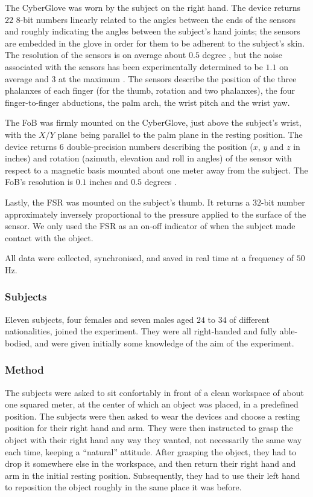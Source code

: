 The CyberGlove was worn by the subject on the right hand. The device
returns $22$ $8$-bit numbers linearly related to the angles between
the ends of the sensors and roughly indicating the angles between the
subject's hand joints; the sensors are embedded in the glove in order
for them to be adherent to the subject's skin. The resolution of the
sensors is on average about $0.5$ degree \cite{cyberglove}, but the
noise associated with the sensors has been experimentally determined
to be $1.1$ on average and $3$ at the maximum \cite{212431}. The
sensors describe the position of the three phalanxes of each finger
(for the thumb, rotation and two phalanxes), the four finger-to-finger
abductions, the palm arch, the wrist pitch and the wrist yaw.

The FoB was firmly mounted on the CyberGlove, just above the subject's
wrist, with the $X/Y$ plane being parallel to the palm plane in the
resting position. The device returns $6$ double-precision numbers
describing the position ($x$, $y$ and $z$ in inches) and rotation
(azimuth, elevation and roll in angles) of the sensor with respect to
a magnetic basis mounted about one meter away from the subject. The
FoB's resolution is $0.1$ inches and $0.5$ degrees \cite{fob}.

Lastly, the FSR was mounted on the subject's thumb. It returns a
$32$-bit number approximately inversely proportional to the pressure
applied to the surface of the sensor. We only used the FSR as an
on-off indicator of when the subject made contact with the object.

All data were collected, synchronised, and saved in real time at a
frequency of $50$Hz.

\subsubsection*{Subjects}

Eleven subjects, four females and seven males aged $24$ to $34$ of
different nationalities, joined the experiment. They were all
right-handed and fully able-bodied, and were given initially some
knowledge of the aim of the experiment.

\subsubsection*{Method}

The subjects were asked to sit confortably in front of a clean
workspace of about one squared meter, at the center of which an object
was placed, in a predefined position. The subjects were then asked to
wear the devices and choose a resting position for their right hand
and arm. They were then instructed to grasp the object with their
right hand any way they wanted, not necessarily the same way each
time, keeping a ``natural'' attitude. After grasping the object, they
had to drop it somewhere else in the workspace, and then return their
right hand and arm in the initial resting position. Subsequently, they
had to use their left hand to reposition the object roughly in the
same place it was before.

